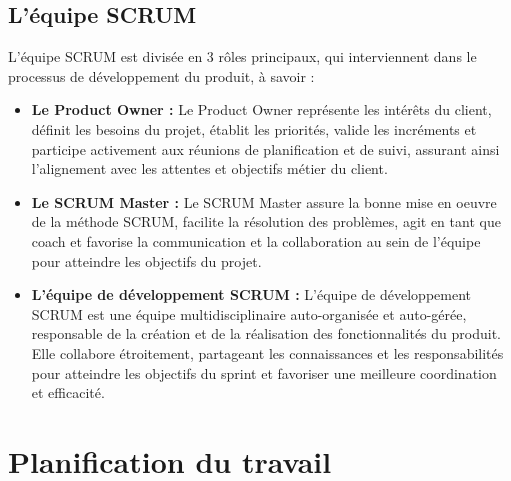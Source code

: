 \subsection{L'équipe SCRUM}
\vspace{5mm}
L’équipe SCRUM est divisée en 3 rôles principaux, qui
interviennent dans le processus de développement du produit, à savoir :
\vspace{6mm}
\begin{itemize}[label=$\bullet$]
\item \textbf{Le Product Owner : } Le Product Owner représente les intérêts du client, définit les besoins du projet, établit les priorités, valide les incréments et participe activement aux réunions de planification et de suivi, assurant ainsi l’alignement avec les attentes et objectifs métier du client.
\vspace{6mm}
\item \textbf{Le SCRUM Master : } Le SCRUM Master assure la bonne mise en oeuvre de la méthode SCRUM,
facilite la résolution des problèmes, agit en tant que coach et favorise la communication et la
collaboration au sein de l’équipe pour atteindre les objectifs du projet.
\vspace{6mm}
\item \textbf{L’équipe de développement SCRUM : } L’équipe de développement SCRUM est une équipe
multidisciplinaire auto-organisée et auto-gérée, responsable de la création et de la réalisation des
fonctionnalités du produit. Elle collabore étroitement, partageant les connaissances et les responsabilités pour atteindre les objectifs du sprint et favoriser une meilleure coordination et efficacité.
\end{itemize}









\newpage
\section{Planification du travail}
\vspace{8mm}

\vspace{8mm}






